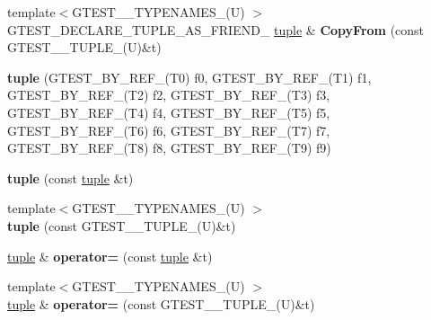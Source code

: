 \begin{DoxyCompactItemize}
\item 
\hypertarget{classstd_1_1tr1_1_1tuple_a3d06fb121d18b6e1c10d14f9e966618d}{}{\footnotesize template$<$G\+T\+E\+S\+T\+\_\+\_\+\+T\+Y\+P\+E\+N\+A\+M\+E\+S\+\_\+(\+U) $>$ }\\G\+T\+E\+S\+T\+\_\+\+D\+E\+C\+L\+A\+R\+E\+\_\+\+T\+U\+P\+L\+E\+\_\+\+A\+S\+\_\+\+F\+R\+I\+E\+N\+D\+\_\+ \hyperlink{classstd_1_1tr1_1_1tuple}{tuple} \& {\bfseries Copy\+From} (const G\+T\+E\+S\+T\+\_\+\_\+\+T\+U\+P\+L\+E\+\_\+(U)\&t)\label{classstd_1_1tr1_1_1tuple_a3d06fb121d18b6e1c10d14f9e966618d}

\item 
\hypertarget{classstd_1_1tr1_1_1tuple_a349b7948d183b7f05c1a5fd6aa4eaeb8}{}{\bfseries tuple} (G\+T\+E\+S\+T\+\_\+\+B\+Y\+\_\+\+R\+E\+F\+\_\+(T0) f0, G\+T\+E\+S\+T\+\_\+\+B\+Y\+\_\+\+R\+E\+F\+\_\+(T1) f1, G\+T\+E\+S\+T\+\_\+\+B\+Y\+\_\+\+R\+E\+F\+\_\+(T2) f2, G\+T\+E\+S\+T\+\_\+\+B\+Y\+\_\+\+R\+E\+F\+\_\+(T3) f3, G\+T\+E\+S\+T\+\_\+\+B\+Y\+\_\+\+R\+E\+F\+\_\+(T4) f4, G\+T\+E\+S\+T\+\_\+\+B\+Y\+\_\+\+R\+E\+F\+\_\+(T5) f5, G\+T\+E\+S\+T\+\_\+\+B\+Y\+\_\+\+R\+E\+F\+\_\+(T6) f6, G\+T\+E\+S\+T\+\_\+\+B\+Y\+\_\+\+R\+E\+F\+\_\+(T7) f7, G\+T\+E\+S\+T\+\_\+\+B\+Y\+\_\+\+R\+E\+F\+\_\+(T8) f8, G\+T\+E\+S\+T\+\_\+\+B\+Y\+\_\+\+R\+E\+F\+\_\+(T9) f9)\label{classstd_1_1tr1_1_1tuple_a349b7948d183b7f05c1a5fd6aa4eaeb8}

\item 
\hypertarget{classstd_1_1tr1_1_1tuple_ade1807f6e6b36daa6387c3b00dbd3be6}{}{\bfseries tuple} (const \hyperlink{classstd_1_1tr1_1_1tuple}{tuple} \&t)\label{classstd_1_1tr1_1_1tuple_ade1807f6e6b36daa6387c3b00dbd3be6}

\item 
\hypertarget{classstd_1_1tr1_1_1tuple_a7ff289d5c5a605e4a4f8fb56913f7370}{}{\footnotesize template$<$G\+T\+E\+S\+T\+\_\+\_\+\+T\+Y\+P\+E\+N\+A\+M\+E\+S\+\_\+(\+U) $>$ }\\{\bfseries tuple} (const G\+T\+E\+S\+T\+\_\+\_\+\+T\+U\+P\+L\+E\+\_\+(U)\&t)\label{classstd_1_1tr1_1_1tuple_a7ff289d5c5a605e4a4f8fb56913f7370}

\item 
\hypertarget{classstd_1_1tr1_1_1tuple_ae52bd211e87c30ea7243246fa06bf038}{}\hyperlink{classstd_1_1tr1_1_1tuple}{tuple} \& {\bfseries operator=} (const \hyperlink{classstd_1_1tr1_1_1tuple}{tuple} \&t)\label{classstd_1_1tr1_1_1tuple_ae52bd211e87c30ea7243246fa06bf038}

\item 
\hypertarget{classstd_1_1tr1_1_1tuple_a9ed59ab84e2ff750d0a188c3d9dac819}{}{\footnotesize template$<$G\+T\+E\+S\+T\+\_\+\_\+\+T\+Y\+P\+E\+N\+A\+M\+E\+S\+\_\+(\+U) $>$ }\\\hyperlink{classstd_1_1tr1_1_1tuple}{tuple} \& {\bfseries operator=} (const G\+T\+E\+S\+T\+\_\+\_\+\+T\+U\+P\+L\+E\+\_\+(U)\&t)\label{classstd_1_1tr1_1_1tuple_a9ed59ab84e2ff750d0a188c3d9dac819}


\end{DoxyCompactItemize}
